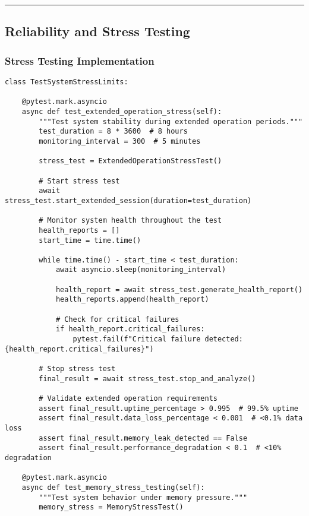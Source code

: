 \documentclass[12pt,a4paper]{article}
\begin{document}
\hrule

\subsection{Reliability and Stress Testing}

\subsubsection{Stress Testing Implementation}

\begin{verbatim}
class TestSystemStressLimits:
    
    @pytest.mark.asyncio
    async def test_extended_operation_stress(self):
        """Test system stability during extended operation periods."""
        test_duration = 8 * 3600  # 8 hours
        monitoring_interval = 300  # 5 minutes
        
        stress_test = ExtendedOperationStressTest()
        
        # Start stress test
        await stress_test.start_extended_session(duration=test_duration)
        
        # Monitor system health throughout the test
        health_reports = []
        start_time = time.time()
        
        while time.time() - start_time < test_duration:
            await asyncio.sleep(monitoring_interval)
            
            health_report = await stress_test.generate_health_report()
            health_reports.append(health_report)
            
            # Check for critical failures
            if health_report.critical_failures:
                pytest.fail(f"Critical failure detected: {health_report.critical_failures}")
        
        # Stop stress test
        final_result = await stress_test.stop_and_analyze()
        
        # Validate extended operation requirements
        assert final_result.uptime_percentage > 0.995  # 99.5% uptime
        assert final_result.data_loss_percentage < 0.001  # <0.1% data loss
        assert final_result.memory_leak_detected == False
        assert final_result.performance_degradation < 0.1  # <10% degradation
    
    @pytest.mark.asyncio
    async def test_memory_stress_testing(self):
        """Test system behavior under memory pressure."""
        memory_stress = MemoryStressTest()
        

\end{verbatim}
\end{document}
